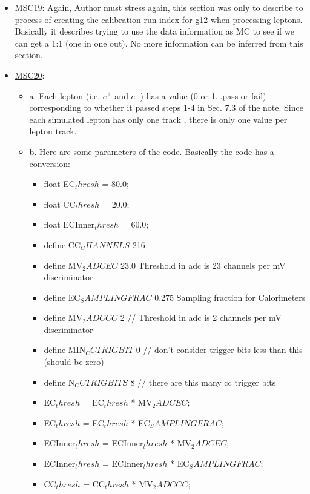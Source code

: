 \documentclass[11pt,a4paper]{article}
\begin{document}
\begin{itemize}
    \item \underline{MSC19}: Again, Author must stress again, this section was only to describe to process of creating the calibration run index for g12 when processing leptons. Basically it describes trying to use the data information as MC to see if we can get a 1:1 (one in one out). No more information can be inferred from this section.
    \item \underline{MSC20}: 
    \begin{itemize}
    	\item a. Each lepton (i.e. $e^+$ and $e^{-}$) has a value (0 or 1...pass or fail) corresponding to whether it passed steps 1-4 in Sec. 7.3 of the note. Since each simulated lepton has only one track , there is only one value per lepton track.
    	\item b. Here are some parameters of the code. Basically the code has a conversion:
    	\begin{itemize}
    		\item  float EC$_thresh $     = 80.0;
    		\item float CC$_thresh $     = 20.0;
    		\item float ECInner$_thresh$ = 60.0; 
    		\item define CC$_CHANNELS$      216
    		\item define MV$_2ADCEC $     23.0    Threshold in adc is 23 channels per mV discriminator
    		\item define EC$_SAMPLINGFRAC$ 0.275   Sampling fraction for Calorimeters
    		\item define MV$_2ADCCC$      2      // Threshold in adc is 2 channels per mV discriminator
    		\item define MIN$_CCTRIGBIT $ 0      // don't consider trigger bits less than this (should be zero)
    		\item define N$_CCTRIGBITS$   8      // there are this many cc trigger bits
    		\item EC$_thresh$      = EC$_thresh $     * MV$_2ADCEC$;
    		\item EC$_thresh$      = EC$_thresh $     * EC$_SAMPLINGFRAC$;
    		\item ECInner$_thresh$ = ECInner$_thresh$ * MV$_2ADCEC$;
    		\item ECInner$_thresh$ = ECInner$_thresh$ * EC$_SAMPLINGFRAC$;
    		\item CC$_thresh$      = CC$_thresh$     * MV$_2ADCCC$;
    	\end{itemize}


\end{itemize}
\end{itemize}
\end{document}
